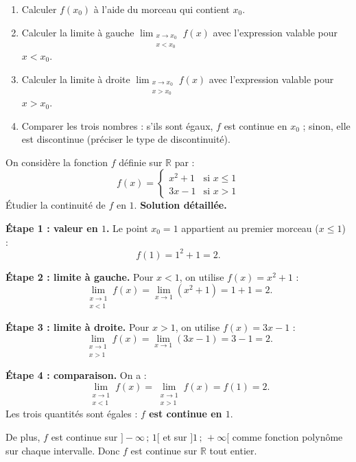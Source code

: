 \documentclass[11pt]{article}
\begin{document}
\begin{methode}
\begin{enumerate}
\item Calculer $f(x_0)$ à l'aide du morceau qui contient $x_0$.
\item Calculer la limite à gauche $\displaystyle\lim_{\substack{x \to x_0 \\ x < x_0}} f(x)$ avec l'expression valable pour $x < x_0$.
\item Calculer la limite à droite $\displaystyle\lim_{\substack{x \to x_0 \\ x > x_0}} f(x)$ avec l'expression valable pour $x > x_0$.
\item Comparer les trois nombres : s'ils sont égaux, $f$ est continue en $x_0$ ; sinon, elle est discontinue (préciser le type de discontinuité).
\end{enumerate}
\end{methode}

\begin{exoresolu}
On considère la fonction $f$ définie sur $\mathbb{R}$ par :
\[
f(x) = \begin{cases} x^2 + 1 & \text{si } x \leq 1 \\ 3x - 1 & \text{si } x > 1 \end{cases}
\]
Étudier la continuité de $f$ en $1$.
\tcblower
\textbf{Solution détaillée.}

\textbf{Étape 1 : valeur en $1$.} Le point $x_0 = 1$ appartient au premier morceau ($x \leq 1$) :
\[
f(1) = 1^2 + 1 = 2.
\]

\textbf{Étape 2 : limite à gauche.} Pour $x < 1$, on utilise $f(x) = x^2 + 1$ :
\[
\lim_{\substack{x \to 1 \\ x < 1}} f(x) = \lim_{x \to 1} (x^2 + 1) = 1 + 1 = 2.
\]

\textbf{Étape 3 : limite à droite.} Pour $x > 1$, on utilise $f(x) = 3x - 1$ :
\[
\lim_{\substack{x \to 1 \\ x > 1}} f(x) = \lim_{x \to 1} (3x - 1) = 3 - 1 = 2.
\]

\textbf{Étape 4 : comparaison.} On a :
\[
\lim_{\substack{x \to 1 \\ x < 1}} f(x) = \lim_{\substack{x \to 1 \\ x > 1}} f(x) = f(1) = 2.
\]
Les trois quantités sont égales : \textbf{$f$ est continue en $1$}.

De plus, $f$ est continue sur $]-\infty\,;\,1[$ et sur $]1\,;\,+\infty[$ comme fonction polynôme sur chaque intervalle. Donc $f$ est continue sur $\mathbb{R}$ tout entier.
\end{exoresolu}
\end{document}
